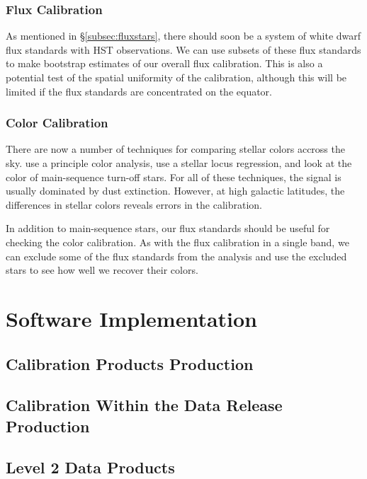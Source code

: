 \documentclass[12pt,preprint]{aastex}
\begin{document}
\subsubsection{Flux Calibration}

As mentioned in \S\ref{subsec:fluxstars}, there should soon be a
system of white dwarf flux standards with HST observations.  We can
use subsets of these flux standards to make bootstrap estimates of our
overall flux calibration.  This is also a potential test of the
spatial uniformity of the calibration, although this will be limited
if the flux standards are concentrated on the equator.

\subsubsection{Color Calibration}

There are now a number of techniques for comparing stellar colors
accross the sky.  \citet{Ivezic04} use a principle color analysis,
\citet{High09} use a stellar locus regression, and \citet{Schlafly10}
look at the color of main-sequence turn-off stars.  For all of these
techniques, the signal is usually dominated by dust extinction.
However, at high galactic latitudes, the differences in stellar colors
reveals errors in the calibration.

In addition to main-sequence stars, our flux standards should be
useful for checking the color calibration.  As with the flux
calibration in a single band, we can exclude some of the flux
standards from the analysis and use the excluded stars to see how
well we recover their colors.


\section{Software Implementation}
\label{sec:software}
\subsection{Calibration Products Production}

\subsection{Calibration Within the Data Release Production}

\subsection{Level 2 Data Products}
\end{document}
